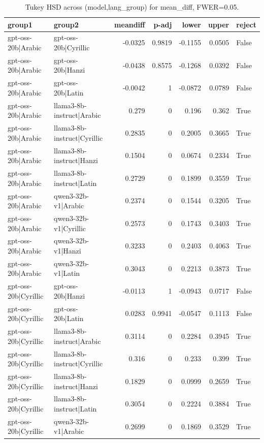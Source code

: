 \begin{table}
\caption{Tukey HSD across (model,lang_group) for mean_diff, FWER=0.05.}
\label{tab:tukey_langgroups_mean_diff}
\begin{tabular}{l l r r r r l}
\toprule
group1 & group2 & meandiff & p-adj & lower & upper & reject \\
\midrule
gpt-oss-20b|Arabic & gpt-oss-20b|Cyrillic & -0.0325 & 0.9819 & -0.1155 & 0.0505 & False \\
gpt-oss-20b|Arabic & gpt-oss-20b|Hanzi & -0.0438 & 0.8575 & -0.1268 & 0.0392 & False \\
gpt-oss-20b|Arabic & gpt-oss-20b|Latin & -0.0042 & 1 & -0.0872 & 0.0789 & False \\
gpt-oss-20b|Arabic & llama3-8b-instruct|Arabic & 0.279 & 0 & 0.196 & 0.362 & True \\
gpt-oss-20b|Arabic & llama3-8b-instruct|Cyrillic & 0.2835 & 0 & 0.2005 & 0.3665 & True \\
gpt-oss-20b|Arabic & llama3-8b-instruct|Hanzi & 0.1504 & 0 & 0.0674 & 0.2334 & True \\
gpt-oss-20b|Arabic & llama3-8b-instruct|Latin & 0.2729 & 0 & 0.1899 & 0.3559 & True \\
gpt-oss-20b|Arabic & qwen3-32b-v1|Arabic & 0.2374 & 0 & 0.1544 & 0.3205 & True \\
gpt-oss-20b|Arabic & qwen3-32b-v1|Cyrillic & 0.2573 & 0 & 0.1743 & 0.3403 & True \\
gpt-oss-20b|Arabic & qwen3-32b-v1|Hanzi & 0.3233 & 0 & 0.2403 & 0.4063 & True \\
gpt-oss-20b|Arabic & qwen3-32b-v1|Latin & 0.3043 & 0 & 0.2213 & 0.3873 & True \\
gpt-oss-20b|Cyrillic & gpt-oss-20b|Hanzi & -0.0113 & 1 & -0.0943 & 0.0717 & False \\
gpt-oss-20b|Cyrillic & gpt-oss-20b|Latin & 0.0283 & 0.9941 & -0.0547 & 0.1113 & False \\
gpt-oss-20b|Cyrillic & llama3-8b-instruct|Arabic & 0.3114 & 0 & 0.2284 & 0.3945 & True \\
gpt-oss-20b|Cyrillic & llama3-8b-instruct|Cyrillic & 0.316 & 0 & 0.233 & 0.399 & True \\
gpt-oss-20b|Cyrillic & llama3-8b-instruct|Hanzi & 0.1829 & 0 & 0.0999 & 0.2659 & True \\
gpt-oss-20b|Cyrillic & llama3-8b-instruct|Latin & 0.3054 & 0 & 0.2224 & 0.3884 & True \\
gpt-oss-20b|Cyrillic & qwen3-32b-v1|Arabic & 0.2699 & 0 & 0.1869 & 0.3529 & True \\

\end{tabular}
\end{table}
